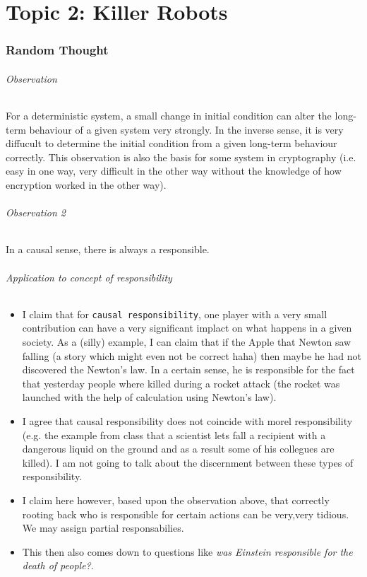 \documentclass[../main/main.tex]{subfiles}
\begin{document}
\newpage
\part{Topic 2: Killer Robots}

\section{Random Thought}
\paragraph{Observation}
For a deterministic system, a small change in initial condition can alter the long-term behaviour of a given system very strongly. In the inverse sense, it is very diffucult to determine the initial condition from a given long-term behaviour correctly. This observation is also the basis for some system in cryptography (i.e. easy in one way, very difficult in the other way without the knowledge of how encryption worked in the other way).

\paragraph{Observation 2}
In a causal sense, there is always a responsible. 

\paragraph{Application to concept of responsibility}
\begin{itemize}
\item I claim that for \texttt{causal responsibility}, one player with a very small contribution can have a very significant implact on what happens in a given society. As a (silly) example, I can claim that if the Apple that Newton saw falling (a story which might even not be correct haha) then maybe he had not discovered the Newton's law. In a certain sense, he is responsible for the fact that yesterday people where killed during a rocket attack (the rocket was launched with the help of calculation using Newton's law).

\item I agree that causal responsibility does not coincide with morel responsibility (e.g. the example from class that a scientist lets fall a recipient with a dangerous liquid on the ground and as a result some of his collegues are killed). I am not going to talk about the discernment between these types of responsibility.

\item I claim here however, based upon the observation above, that correctly rooting back who is responsible for certain actions can be very,very tidious. We may assign partial responsabilies.

\item This then also comes down to questions like \textit{was Einstein responsible for the death of people?}.
\end{itemize}
\end{document}
